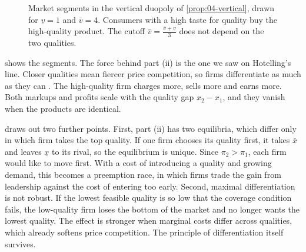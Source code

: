 \begin{figure}[htbp]
\centering
{}
\caption{Market segments in the vertical duopoly of \cref{prop:04-vertical}, drawn for $\underline v = 1$ and
$\bar v = 4$. Consumers with a high taste for quality buy the high-quality product. The cutoff
$\hat v = \frac{\bar v + \underline v}{3}$ does not depend on the two qualities.}
\label{fig:04-vertical}
\end{figure}

 shows the segments. The force behind part (ii) is the one we saw on Hotelling's line. Closer
qualities mean fiercer price competition, so firms differentiate as much as they can
\citep{GabszewiczThisse1979,ShakedSutton1982}. The high-quality firm charges more, sells more and earns more. Both
markups and profits scale with the quality gap $x_2 - x_1$, and they vanish when the products are identical.

 draws out two further points. First, part (ii) has two equilibria, which differ
only in which firm takes the top quality. If one firm chooses its quality first, it takes $\bar x$ and leaves
$\underline x$ to its rival, so the equilibrium is unique. Since $\pi_2 > \pi_1$, each firm would like to move first.
With a cost of introducing a quality and growing demand, this becomes a preemption race, in which firms trade the
gain from leadership against the cost of entering too early. Second, maximal differentiation is not robust. If the
lowest feasible quality is so low that the coverage condition fails, the low-quality firm loses the bottom of the
market and no longer wants the lowest quality. The effect is stronger when marginal costs differ across qualities,
which already softens price competition. The principle of differentiation itself survives.

